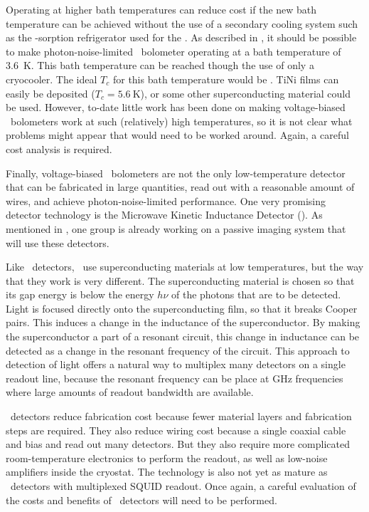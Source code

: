 Operating at higher bath temperatures can reduce cost if the new bath temperature can be achieved without the use of a secondary cooling system such as the -sorption refrigerator used for the \Imager.
As described in , it should be possible to make photon-noise-limited \TES\ bolometer operating at a bath temperature of \SI{3.6}{\K}.
This bath temperature can be reached though the use of only a cryocooler.
The ideal $T_c$ for this bath temperature would be .
TiNi films can easily be deposited ($T_c = \SI{5.6}{\K}$), or some other superconducting material could be used.
However, to-date little work has been done on making voltage-biased \TES\ bolometers work at such (relatively) high temperatures, so it is not clear what problems might appear that would need to be worked around.
Again, a careful cost analysis is required.

Finally, voltage-biased \TES\ bolometers are not the only low-temperature detector that can be fabricated in large quantities, read out with a reasonable amount of wires, and achieve photon-noise-limited performance.
One very promising detector technology is the Microwave Kinetic Inductance Detector (\MKID).
As mentioned in , one group is already working on a passive imaging system that will use these detectors.

Like \TES\ detectors, \MKIDs\ use superconducting materials at low temperatures, but the way that they work is very different.
The superconducting material is chosen so that its gap energy is below the energy $h \nu$ of the photons that are to be detected.
Light is focused directly onto the superconducting film, so that it breaks Cooper pairs.
This induces a change in the inductance of the superconductor.
By making the superconductor a part of a resonant circuit, this change in inductance can be detected as a change in the resonant frequency of the circuit.
This approach to detection of light offers a natural way to multiplex many detectors on a single readout line, because the resonant frequency can be place at \si{\GHz} frequencies where large amounts of readout bandwidth are available.

\MKID\ detectors reduce fabrication cost because fewer material layers and fabrication steps are required.
They also reduce wiring cost because a single coaxial cable and bias and read out many detectors.
But they also require more complicated room-temperature electronics to perform the readout, as well as low-noise amplifiers inside the cryostat.
The technology is also not yet as mature as \TES\ detectors with multiplexed SQUID readout.
Once again, a careful evaluation of the costs and benefits of \MKID\ detectors will need to be performed.


